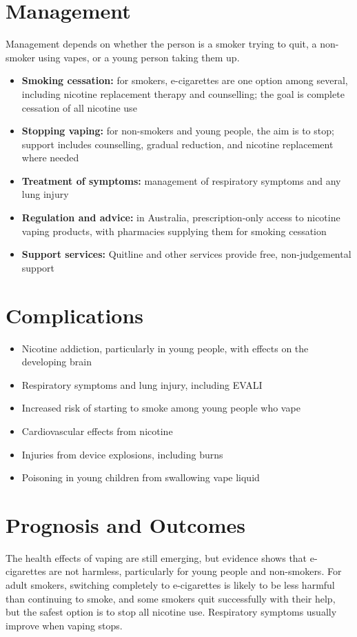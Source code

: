 \section*{Management}
Management depends on whether the person is a smoker trying to quit, a non-smoker using vapes, or a young person taking them up.
\begin{itemize}
    \item \textbf{Smoking cessation:} for smokers, e-cigarettes are one option among several, including nicotine replacement therapy and counselling; the goal is complete cessation of all nicotine use
    \item \textbf{Stopping vaping:} for non-smokers and young people, the aim is to stop; support includes counselling, gradual reduction, and nicotine replacement where needed
    \item \textbf{Treatment of symptoms:} management of respiratory symptoms and any lung injury
    \item \textbf{Regulation and advice:} in Australia, prescription-only access to nicotine vaping products, with pharmacies supplying them for smoking cessation
    \item \textbf{Support services:} Quitline and other services provide free, non-judgemental support
\end{itemize}

\section*{Complications}
\begin{itemize}
    \item Nicotine addiction, particularly in young people, with effects on the developing brain
    \item Respiratory symptoms and lung injury, including EVALI
    \item Increased risk of starting to smoke among young people who vape
    \item Cardiovascular effects from nicotine
    \item Injuries from device explosions, including burns
    \item Poisoning in young children from swallowing vape liquid
\end{itemize}

\section*{Prognosis and Outcomes}
The health effects of vaping are still emerging, but evidence shows that e-cigarettes are not harmless, particularly for young people and non-smokers. For adult smokers, switching completely to e-cigarettes is likely to be less harmful than continuing to smoke, and some smokers quit successfully with their help, but the safest option is to stop all nicotine use. Respiratory symptoms usually improve when vaping stops.

